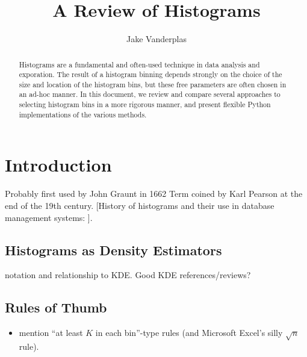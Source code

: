 \documentclass[12pt]{article}
\title{A Review of Histograms}
\author{Jake Vanderplas}
\begin{document}
\maketitle

\begin{abstract}
  Histograms are a fundamental and often-used technique in data analysis and
  exporation.  The result of a histogram binning depends strongly on the
  choice of the size and location of the histogram bins, but these free
  parameters are often chosen in an ad-hoc manner.  In this document, we
  review and compare several approaches to selecting histogram bins in a
  more rigorous manner, and present flexible Python implementations of
  the various methods.
\end{abstract}

\section{Introduction}
Probably first used by John Graunt in 1662 \citep{Scott1979}
Term coined by Karl Pearson at the end of the 19th century.
[History of histograms and their use in database management systems:
\citet{Ioannidis2003}].

\subsection{Histograms as Density Estimators}
notation and relationship to KDE.  Good KDE references/reviews?

\subsection{Rules of Thumb}
\begin{itemize}
\item mention ``at least $K$ in each bin''-type rules
  (and Microsoft Excel's silly $\sqrt{n}$ rule).
\end{itemize}
\end{document}
